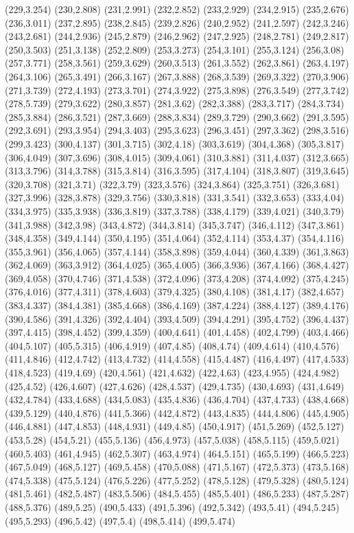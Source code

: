 (229,3.254)
(230,2.808)
(231,2.991)
(232,2.852)
(233,2.929)
(234,2.915)
(235,2.676)
(236,3.011)
(237,2.895)
(238,2.845)
(239,2.826)
(240,2.952)
(241,2.597)
(242,3.246)
(243,2.681)
(244,2.936)
(245,2.879)
(246,2.962)
(247,2.925)
(248,2.781)
(249,2.817)
(250,3.503)
(251,3.138)
(252,2.809)
(253,3.273)
(254,3.101)
(255,3.124)
(256,3.08)
(257,3.771)
(258,3.561)
(259,3.629)
(260,3.513)
(261,3.552)
(262,3.861)
(263,4.197)
(264,3.106)
(265,3.491)
(266,3.167)
(267,3.888)
(268,3.539)
(269,3.322)
(270,3.906)
(271,3.739)
(272,4.193)
(273,3.701)
(274,3.922)
(275,3.898)
(276,3.549)
(277,3.742)
(278,5.739)
(279,3.622)
(280,3.857)
(281,3.62)
(282,3.388)
(283,3.717)
(284,3.734)
(285,3.884)
(286,3.521)
(287,3.669)
(288,3.834)
(289,3.729)
(290,3.662)
(291,3.595)
(292,3.691)
(293,3.954)
(294,3.403)
(295,3.623)
(296,3.451)
(297,3.362)
(298,3.516)
(299,3.423)
(300,4.137)
(301,3.715)
(302,4.18)
(303,3.619)
(304,4.368)
(305,3.817)
(306,4.049)
(307,3.696)
(308,4.015)
(309,4.061)
(310,3.881)
(311,4.037)
(312,3.665)
(313,3.796)
(314,3.788)
(315,3.814)
(316,3.595)
(317,4.104)
(318,3.807)
(319,3.645)
(320,3.708)
(321,3.71)
(322,3.79)
(323,3.576)
(324,3.864)
(325,3.751)
(326,3.681)
(327,3.996)
(328,3.878)
(329,3.756)
(330,3.818)
(331,3.541)
(332,3.653)
(333,4.04)
(334,3.975)
(335,3.938)
(336,3.819)
(337,3.788)
(338,4.179)
(339,4.021)
(340,3.79)
(341,3.988)
(342,3.98)
(343,4.872)
(344,3.814)
(345,3.747)
(346,4.112)
(347,3.861)
(348,4.358)
(349,4.144)
(350,4.195)
(351,4.064)
(352,4.114)
(353,4.37)
(354,4.116)
(355,3.961)
(356,4.065)
(357,4.144)
(358,3.898)
(359,4.044)
(360,4.339)
(361,3.863)
(362,4.069)
(363,3.912)
(364,4.025)
(365,4.005)
(366,3.936)
(367,4.166)
(368,4.427)
(369,4.058)
(370,4.746)
(371,4.538)
(372,4.096)
(373,4.208)
(374,4.092)
(375,4.245)
(376,4.016)
(377,4.311)
(378,4.603)
(379,4.325)
(380,4.108)
(381,4.17)
(382,4.657)
(383,4.337)
(384,4.381)
(385,4.668)
(386,4.169)
(387,4.224)
(388,4.127)
(389,4.176)
(390,4.586)
(391,4.326)
(392,4.404)
(393,4.509)
(394,4.291)
(395,4.752)
(396,4.437)
(397,4.415)
(398,4.452)
(399,4.359)
(400,4.641)
(401,4.458)
(402,4.799)
(403,4.466)
(404,5.107)
(405,5.315)
(406,4.919)
(407,4.85)
(408,4.74)
(409,4.614)
(410,4.576)
(411,4.846)
(412,4.742)
(413,4.732)
(414,4.558)
(415,4.487)
(416,4.497)
(417,4.533)
(418,4.523)
(419,4.69)
(420,4.561)
(421,4.632)
(422,4.63)
(423,4.955)
(424,4.982)
(425,4.52)
(426,4.607)
(427,4.626)
(428,4.537)
(429,4.735)
(430,4.693)
(431,4.649)
(432,4.784)
(433,4.688)
(434,5.083)
(435,4.836)
(436,4.704)
(437,4.733)
(438,4.668)
(439,5.129)
(440,4.876)
(441,5.366)
(442,4.872)
(443,4.835)
(444,4.806)
(445,4.905)
(446,4.881)
(447,4.853)
(448,4.931)
(449,4.85)
(450,4.917)
(451,5.269)
(452,5.127)
(453,5.28)
(454,5.21)
(455,5.136)
(456,4.973)
(457,5.038)
(458,5.115)
(459,5.021)
(460,5.403)
(461,4.945)
(462,5.307)
(463,4.974)
(464,5.151)
(465,5.199)
(466,5.223)
(467,5.049)
(468,5.127)
(469,5.458)
(470,5.088)
(471,5.167)
(472,5.373)
(473,5.168)
(474,5.338)
(475,5.124)
(476,5.226)
(477,5.252)
(478,5.128)
(479,5.328)
(480,5.124)
(481,5.461)
(482,5.487)
(483,5.506)
(484,5.455)
(485,5.401)
(486,5.233)
(487,5.287)
(488,5.376)
(489,5.25)
(490,5.433)
(491,5.396)
(492,5.342)
(493,5.41)
(494,5.245)
(495,5.293)
(496,5.42)
(497,5.4)
(498,5.414)
(499,5.474)
